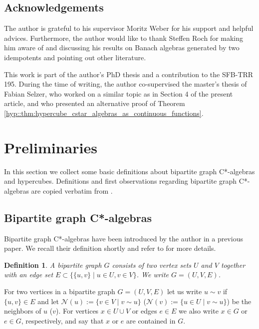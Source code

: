 \documentclass[a4paper]{amsart}
\newtheorem{definition}[thm]{Definition}
\begin{document}
\subsection{Acknowledgements}

The author is grateful to his supervisor Moritz Weber for his support and helpful advices. Furthermore, the author would like to thank Steffen Roch for making him aware of and discussing his results on Banach algebras generated by two idempotents and pointing out other literature. 

This work is part of the author's PhD thesis and a contribution to the SFB-TRR 195. During the time of writing, the author co-supervised the master's thesis of Fabian Selzer, who worked on a similar topic as in Section 4 of the present article, and who presented an alternative proof of Theorem \ref{hyp::thm:hypercube_cstar_algebras_as_continuous_functions}. 

\section{Preliminaries}
\label{sec::preliminaries}

In this section we collect some basic definitions about bipartite graph C*-algebras and hypercubes. Definitions and first observations regarding bipartite graph C*-algebras are copied verbatim from \cite{schafer_classification_2025}.

\subsection{Bipartite graph C*-algebras}

Bipartite graph C*-algebras have been introduced by the author in a previous paper. We recall their definition shortly and refer to \cite{schafer_classification_2025} for more details. 

\begin{definition}
    A bipartite graph $G$ consists of two vertex sets $U$ and $V$ together with an edge set $E \subset \{\{u,v\}\mid u \in U, v \in V\}$. We write $G = (U, V, E)$.
\end{definition}

For two vertices in a bipartite graph $G = (U, V, E)$ let us write $u \sim v$ if $\{u,v\} \in E$ and let $\mathcal{N}(u) := \{v \in V\mid v \sim u\}$ ($\mathcal{N}(v) := \{u \in U\mid v \sim u\}$) be the neighbors of $u$ ($v$). For vertices $x \in U \cup V$ or edges $e \in E$ we also write $x \in G$ or $e \in G$, respectively, and say that $x$ or $e$ are contained in $G$. 
\end{document}

